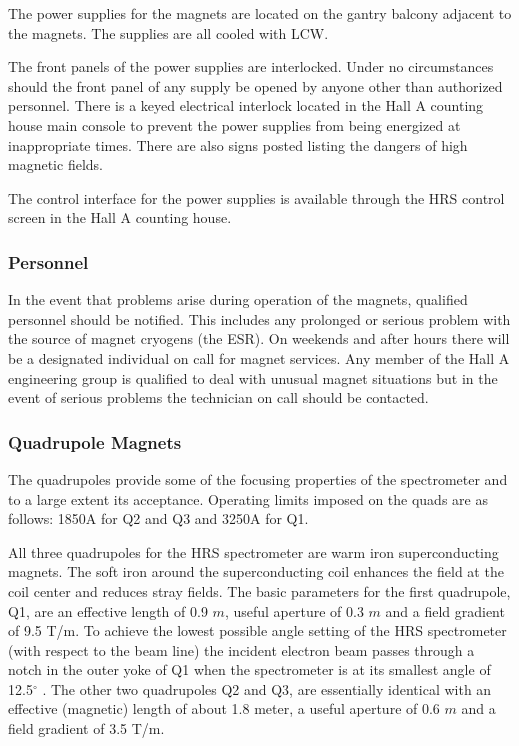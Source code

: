 The power supplies for the magnets are located on the gantry balcony 
adjacent to the magnets.  The supplies are all cooled with LCW.

The front panels of the power supplies are interlocked.  Under no 
circumstances should the front panel of any supply be opened by anyone 
other than authorized personnel.  There is a keyed electrical interlock 
located in the Hall A counting house main console to prevent the power 
supplies from being energized at inappropriate times.  There are also 
signs posted listing the dangers of high magnetic fields.

The control interface for the power supplies is available through the 
HRS control screen in the Hall A counting house.

\subsubsection{Personnel}

In the event that problems arise during 
operation of the magnets, qualified personnel should be notified.  This 
includes any prolonged or serious problem with the source of magnet 
cryogens (the ESR).  On weekends and after hours there will be a 
designated individual on call for magnet services.  Any member of the 
Hall A engineering group is qualified to deal with unusual magnet 
situations but in the event of serious problems the technician on
call should be contacted.

\subsubsection{Quadrupole Magnets}

The quadrupoles provide some of the 
focusing properties of the spectrometer and to a large extent 
its acceptance.  Operating limits imposed on the 
quads are as follows: 1850A for Q2 and Q3 and 3250A 
for Q1.

All three quadrupoles for the HRS spectrometer are warm iron 
superconducting magnets.  The soft iron around the superconducting coil 
enhances the field at the coil center and reduces stray fields.  The 
basic parameters for the first quadrupole, Q1, are an effective length of 
0.9 $m$, useful aperture of 0.3 $m$ and a field gradient of 9.5 
T/m.  To achieve the lowest possible angle setting of the HRS 
spectrometer (with respect to the beam line) the incident electron beam passes through
a notch in the outer yoke of Q1 when the spectrometer is at
its smallest angle of 12.5$^\circ$ . The 
other two quadrupoles Q2 and Q3, are essentially identical with an 
effective (magnetic) length of about 1.8 meter, a useful aperture of 
0.6 $m$ and a field gradient of 3.5 T/m.

